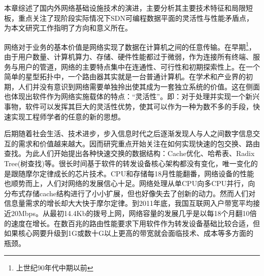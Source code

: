 
\label{sec:pdpintro}











本章综述了国内外网络基础设施技术的演进，主要分析其主要技术特征和局限短板，重点关注了现阶段实际情况下SDN可编程数据平面的灵活性与性能矛盾点，为本文研究工作指明了方向和意义所在。














网络对于业务的基本价值是网络实现了数据在计算机之间的任意传输。在早期\footnote{上世纪90年代中期以前}，由于用户数量、计算机算力、存储、硬件性能都过于微弱，作为连接所有终端、服务与用户的管道，网络的主要特点集中在连通性、可行性和初期探索性上。在一个简单的星型拓扑中，一个路由器其实就是一台普通计算机。在学术和产业界的初期，人们并没有意识到网络需要单独拎出使其成为一套独立系统的价值。这在侧面也体现出软件作为网络实施载体的特点：“灵活性”。即：对于处理并实现一个新兴事物，软件可以发挥其巨大的灵活性优势，使其可以作为一种为数不多的手段，快速实现工程师学者的任意的新的思想。

后期随着社会生活、技术进步，步入信息时代之后逐渐发现人与人之间数字信息交互的需求和价值越来越大。因而研究重点开始关注在如何实现快速的包交换、路由查找。为此人们开始提出各种快速交换的数据结构：Cache优化、哈希表、Radix Tree(树查找)等。很长时间基于软件的转发设备核心架构都没有变化，唯一变化的是跟随摩尔定律成长的芯片技术。CPU和存储每18月性能翻番，网络设备的性能也顺势而上，人们对网络的发展信心十足。网络处理从单CPU向多CPU并行，向分布式存储cache结构进行了小小扩展，但也好像失去了创新的动力。然而人们对信息量需求的增长却大大快于摩尔定律。到2011年底，我国互联网入户带宽平均接近20Mbps。从最初14.4Kb的拨号上网，网络容量的发展几乎是以每18个月翻10倍的速度在增长。在数百兆的路由性能要求下用软件作为转发设备基础比较合适，但如果核心网要升级到1G或数十G以上更高的带宽就会面临技术、成本等多方面的瓶颈。

